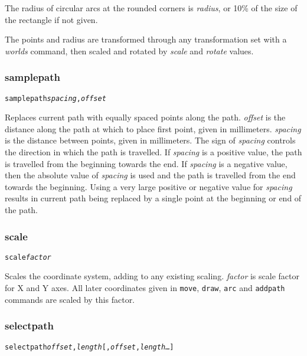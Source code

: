 The radius of circular arcs at the rounded corners is 
\textit{radius}, or 10\% of the size of the rectangle if not given.

The points and radius are transformed through any
transformation set with a \textit{worlds} command,
then scaled and rotated by \textit{scale}
and \textit{rotate} values.

\subsubsection{samplepath}

\begin{alltt}
samplepath \textit{spacing}, \textit{offset}
\end{alltt}

Replaces current path with equally spaced points along the path.
\textit{offset} is the distance along the path at which to place first point,
given in millimeters.  \textit{spacing} is the distance between points, given
in millimeters.  The sign of \textit{spacing} controls the direction in which
the path is travelled.  If \textit{spacing} is a positive value, the path is
travelled from the beginning towards the end.  If \textit{spacing} is a
negative value, then the absolute value of \textit{spacing} is used and the
path is travelled from the end towards the beginning.  Using a very large
positive or negative value for \textit{spacing} results in current path being
replaced by a single point at the beginning or end of the path.

\subsubsection{scale}

\begin{alltt}
scale \textit{factor}
\end{alltt}

Scales the coordinate system, adding to any existing scaling.  \textit{factor}
is scale factor for X and Y axes.  All later coordinates given in
\texttt{move}, \texttt{draw}, \texttt{arc} and \texttt{addpath} commands are
scaled by this factor.

\subsubsection{selectpath}

\begin{alltt}
selectpath \textit{offset}, \textit{length} [, \textit{offset}, \textit{length}  \dots ]
\end{alltt}

